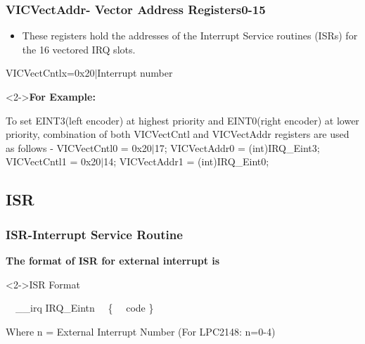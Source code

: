 \documentclass[table,10pt,red]{beamer}
\begin{document}
\begin{frame}
	\frametitle{VICVectAddr- Vector Address Registers0-15}
	\begin{itemize}
		\item These registers hold the addresses of the	Interrupt Service routines (ISRs) for the 16 vectored IRQ slots. \pause \\[5pt] 
	\end{itemize} 
	\hspace{1cm}VICVectCntlx\hspace{1pt}=\hspace{1pt}\color{red}0x20$|$Interrupt number \color{black}\\[5pt]
	\begin{block}<2->{\textbf{For Example:}}\pause
		\begin{semiverbatim}
			\small
			 To set EINT3(left encoder) at highest priority and EINT0(right encoder) at lower priority, combination of both VICVectCntl and VICVectAddr registers are used as follows - \newline 
			\color{red} VICVectCntl0 = 0x20$|$17; \newline
			            VICVectAddr0 = (int)IRQ\_Eint3; \newline
			            VICVectCntl1 = 0x20$|$14; \newline
			            VICVectAddr1 = (int)IRQ\_Eint0; \newline
		\end{semiverbatim} 
	\end{block}
	
\end{frame}

\subsection{ISR}
\begin{frame}[fragile]
		\frametitle{ISR-Interrupt Service Routine} \pause
			\textbf{The format of ISR for external interrupt is} \pause \\[20pt]
			
			\begin{block}<2->{ISR Format}\pause
				\begin{semiverbatim}
				\ \ __irq IRQ_Eint\color{red}n\color{black}
				\ \ \{
 			 \ \		code 		
 				\}
 				\end{semiverbatim} 
 			\pause Where n = External Interrupt Number (For LPC2148: n=0-4)
 			\end{block}			
\end{frame}
\end{document}
